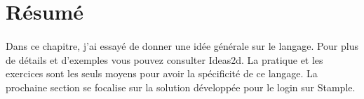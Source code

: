 \section{Résumé}
\paragraph{}
Dans ce chapitre, j'ai essayé de donner une idée générale sur le langage. Pour plus de détails et d'exemples vous pouvez consulter Ideas2d. 
La pratique et les exercices sont les seuls moyens pour avoir la spécificité de ce langage.
La prochaine section se focalise sur la solution développée pour le login sur Stample.







